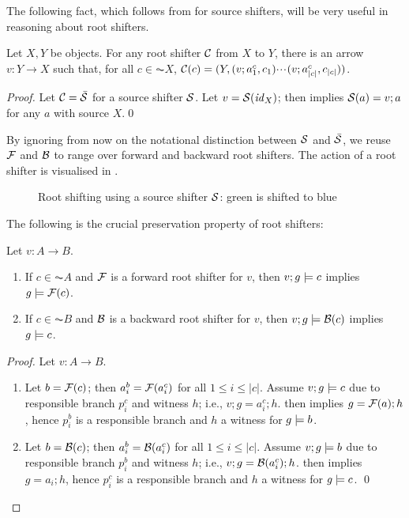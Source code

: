 \begin{fullorname}
The following fact, which follows from  for source shifters, will be very useful in reasoning about root shifters.
%
\begin{lemma}
Let $X,Y$ be objects. For any root shifter $\mathcal{C}$ from $X$ to $Y$, there is an arrow $v:Y\to X$ such that, for all $c\in \AC X$, $\mathcal{C}(c)= (Y,(v;a^c_1,c_1){\cdotp\mkern-2mu\cdotp\mkern-2mu\cdotp\mkern1mu} (v;a^c_{|c|},c_{|c|}))$.
\end{lemma}
%
\begin{proof}
Let $\mathcal{C}=\bar{\mathcal{S}}$ for a source shifter $\mathcal{S}$. Let $v=\mathcal{S}(\mathit{id}_X)$; then  implies $\mathcal{S}(a)=v;a$ for any $a$ with source $X$.\qed
\end{proof}
\end{fullorname}
%
By ignoring from now on the notational distinction between $\mathcal{S}$ and $\bar{\mathcal{S}}$, we reuse $\mathcal{F}$ and $\mathcal{B}$ to range over forward and backward root shifters. The action of a root shifter is visualised in .
%
\begin{figure}[t]
\centering

\caption{Root shifting using a source shifter $\mathcal{S}$: green is shifted to blue}
\end{figure}
%
The following is the crucial preservation property of root shifters:
%
\begin{proposition}
Let $v:A\to B$.
\begin{enumerate}[topsep=\smallskipamount]
\item If $c\in \AC A$ and $\mathcal{F}$ is a forward root shifter for $v$, then $v;g\models c$ implies $g\models \mathcal{F}(c)$.
\item If $c\in \AC B$ and $\mathcal{B}$ is a backward root shifter for $v$, then $v;g\models \mathcal{B}(c)$ implies $g\models c$.
\end{enumerate}
\end{proposition}
%
\begin{fullorname}
\begin{proof}
Let $v:A\to B$.
\begin{enumerate}
\item Let $b=\mathcal{F}(c)$; then $a^b_i=\mathcal{F}(a^c_i)$ for all $1\leq i\leq |c|$. Assume $v;g\models c$ due to responsible branch $p^c_i$ and witness $h$; i.e., $v;g=a^c_i;h$.  then implies $g=\mathcal{F}(a);h$, hence $p^b_i$ is a responsible branch and $h$ a witness for $g\models b$.
\item Let $b=\mathcal{B}(c)$; then $a^b_i=\mathcal{B}(a^c_i)$ for all $1\leq i\leq |c|$. Assume $v;g\models b$ due to responsible branch $p^b_i$ and witness $h$; i.e., $v;g=\mathcal{B}(a^c_i);h$.  then implies $g=a_i;h$, hence $p^c_i$ is a responsible branch and $h$ a witness for $g\models c$.
\qed
\end{enumerate}
\end{proof}
\end{fullorname}
